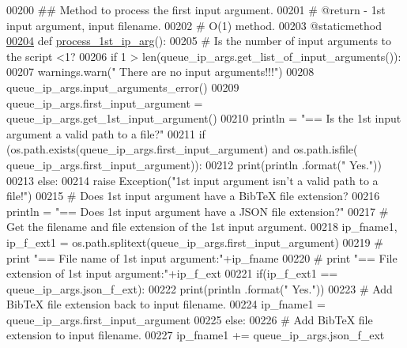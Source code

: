 \begin{DoxyCode}
00200     \textcolor{comment}{##  Method to process the first input argument.}
00201     \textcolor{comment}{#   @return - 1st input argument, input filename.}
00202     \textcolor{comment}{#   O(1) method.}
00203     @staticmethod
\hypertarget{queue__ip__arguments_8py_source_l00204}{}\hyperlink{classutilities_1_1queue__ip__arguments_1_1queue__ip__args_ae1fc6d7af2e429d0656dbf388711db94}{00204}     \textcolor{keyword}{def }\hyperlink{classutilities_1_1queue__ip__arguments_1_1queue__ip__args_ae1fc6d7af2e429d0656dbf388711db94}{process\_1st\_ip\_arg}():
00205         \textcolor{comment}{#   Is the number of input arguments to the script <1?}
00206         \textcolor{keywordflow}{if} 1 > len(queue\_ip\_args.get\_list\_of\_input\_arguments()):
00207             warnings.warn(\textcolor{stringliteral}{" There are no input arguments!!!"})
00208             queue\_ip\_args.input\_arguments\_error()
00209         queue\_ip\_args.first\_input\_argument = queue\_ip\_args.get\_1st\_input\_argument()
00210         println = \textcolor{stringliteral}{"==   Is the 1st input argument a valid path to a file?"}
00211         \textcolor{keywordflow}{if} (os.path.exists(queue\_ip\_args.first\_input\_argument) \textcolor{keywordflow}{and} os.path.isfile(
      queue\_ip\_args.first\_input\_argument)):
00212             print(println .format(\textcolor{stringliteral}{" Yes."}))
00213         \textcolor{keywordflow}{else}:
00214             \textcolor{keywordflow}{raise} Exception(\textcolor{stringliteral}{"1st input argument isn't a valid path to a file!"})
00215         \textcolor{comment}{#   Does 1st input argument have a BibTeX file extension?}
00216         println = \textcolor{stringliteral}{"==   Does 1st input argument have a JSON file extension?"}
00217         \textcolor{comment}{#   Get the filename and file extension of the 1st input argument.}
00218         ip\_fname1, ip\_f\_ext1 = os.path.splitext(queue\_ip\_args.first\_input\_argument)
00219 \textcolor{comment}{#   print "==   File name of 1st input argument:"+ip\_fname}
00220 \textcolor{comment}{#   print "==   File extension of 1st input argument:"+ip\_f\_ext}
00221         if(ip\_f\_ext1 == queue\_ip\_args.json\_f\_ext):
00222             print(println .format(\textcolor{stringliteral}{" Yes."}))
00223             \textcolor{comment}{#   Add BibTeX file extension back to input filename.}
00224             ip\_fname1 = queue\_ip\_args.first\_input\_argument
00225         \textcolor{keywordflow}{else}:
00226             \textcolor{comment}{#   Add BibTeX file extension to input filename.}
00227             ip\_fname1 += queue\_ip\_args.json\_f\_ext

\end{DoxyCode}
